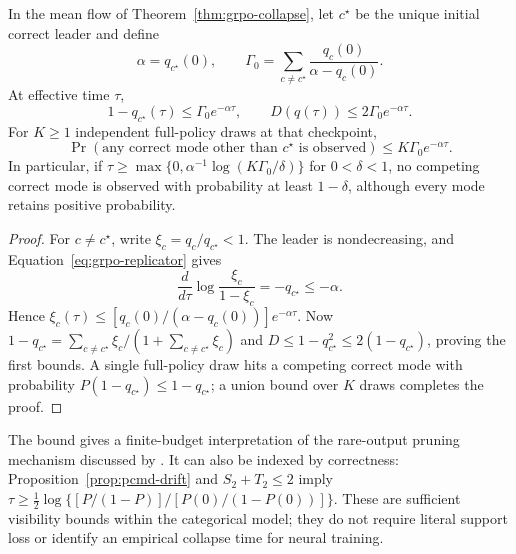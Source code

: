 \begin{corollary}
\enforcehalffinalproseline
\label{cor:finite-budget-invisibility}
In the mean flow of Theorem~\ref{thm:grpo-collapse}, let $c^\star$ be the
unique initial correct leader and define
\[
 \alpha=q_{c^\star}(0),
 \qquad
 \Gamma_0=\sum_{c\ne c^\star}
             \frac{q_c(0)}{\alpha-q_c(0)}.
\]
At effective time $\tau$,
\begin{equation}
 1-q_{c^\star}(\tau)\le\Gamma_0e^{-\alpha\tau},
 \qquad D(q(\tau))\le2\Gamma_0e^{-\alpha\tau}.
 \label{eq:finite-minority-bound}
\end{equation}
For $K\ge1$ independent full-policy draws at that checkpoint,
\begin{equation}
 \Pr(\text{any correct mode other than }c^\star\text{ is observed})
 \le K\Gamma_0e^{-\alpha\tau}.
 \label{eq:finite-inference-visibility}
\end{equation}
In particular, if
$\tau\ge\max\{0,\alpha^{-1}\log(K\Gamma_0/\delta)\}$ for
$0<\delta<1$, no competing correct mode is observed with probability at
least $1-\delta$, although every mode retains positive probability.
\end{corollary}

\begin{proof}
\enforcehalffinalproseline
For $c\ne c^\star$, write $\xi_c=q_c/q_{c^\star}<1$.
The leader is nondecreasing, and Equation~\eqref{eq:grpo-replicator} gives
\[
 \frac{d}{d\tau}\log\frac{\xi_c}{1-\xi_c}
 =-q_{c^\star}\le-\alpha.
\]
Hence
$\xi_c(\tau)\le[q_c(0)/(\alpha-q_c(0))]e^{-\alpha\tau}$.
Now $1-q_{c^\star}=\sum_{c\ne c^\star}\xi_c/(1+\sum_{c\ne c^\star}\xi_c)$
and $D\le1-q_{c^\star}^2\le2(1-q_{c^\star})$, proving the first bounds.
A single full-policy draw hits a competing correct mode with probability
$P(1-q_{c^\star})\le1-q_{c^\star}$; a union bound over $K$ draws completes
the proof.
\end{proof}

The bound gives a finite-budget interpretation of the rare-output pruning
mechanism discussed by \citet[Section~4.2.5]{lochab2026ucpo}.
It can also be indexed by correctness: Proposition~\ref{prop:pcmd-drift}
and $S_2+T_2\le2$ imply
$\tau\ge\tfrac12\log\{[P/(1-P)]/[P(0)/(1-P(0))]\}$.
These are sufficient visibility bounds within the categorical model;
they do not require literal support loss or identify an empirical collapse
time for neural training.


